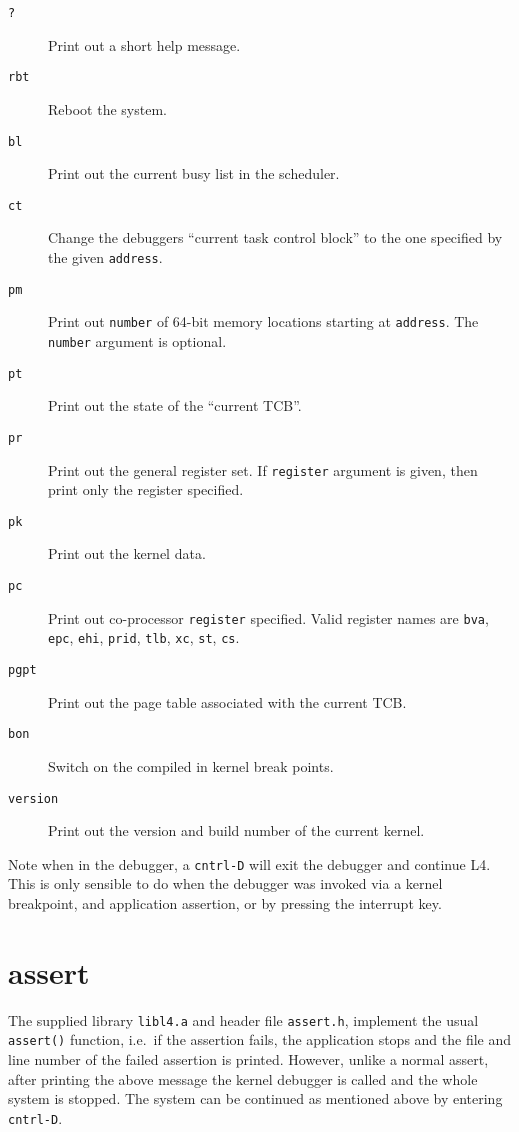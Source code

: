 \documentclass[a4paper,11pt,twoside,dvips]{book}
\begin{document}
\begin{description}
\item[\texttt{?}] Print out a short help message.
\item[\texttt{rbt}] Reboot the system.
\item[\texttt{bl}] Print out the current busy list in the scheduler.
\item[\texttt{ct}] Change the debuggers ``current task control block''
  to the one specified by the given \texttt{address}.
\item[\texttt{pm}] Print out \texttt{number} of 64-bit memory locations
  starting at \texttt{address}. The \texttt{number} argument is
  optional.
\item[\texttt{pt}] Print out the state of the ``current TCB''.
\item[\texttt{pr}] Print out the general register set. If
  \texttt{register} argument is given, then print only the register
  specified.
\item[\texttt{pk}] Print out the kernel data.
\item[\texttt{pc}] Print out co-processor \texttt{register}
  specified. Valid register names are \texttt{bva}, \texttt{epc},
  \texttt{ehi}, \texttt{prid}, \texttt{tlb}, \texttt{xc}, \texttt{st},
  \texttt{cs}. 
\item[\texttt{pgpt}] Print out the page table associated with the
  current TCB.
\item[\texttt{bon}] Switch on the compiled in kernel break points.
\item[\texttt{version}] Print out the version and build number of the
  current kernel.
\end{description}

Note when in the debugger, a \texttt{cntrl-D} will exit the debugger and
continue L4. This is only sensible to do when the debugger was invoked
via a kernel breakpoint, and application assertion, or by
pressing the interrupt key.

\section{assert}

The supplied library \texttt{libl4.a} and header file \texttt{assert.h},
implement the usual \texttt{assert()} function, i.e.\ if the assertion
fails, the application stops and the file and line number of the failed
assertion is printed. However, unlike a normal assert, after printing
the above message the kernel debugger is called and the whole system is
stopped.  The system can be continued as mentioned above by entering
\texttt{cntrl-D}.
\end{document}
